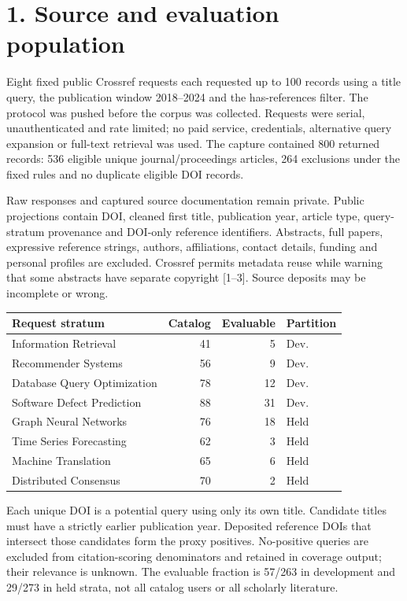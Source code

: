 \documentclass[10pt,letterpaper]{article}
\begin{document}
\newpage
\section*{1. Source and evaluation population}
Eight fixed public Crossref requests each requested up to 100 records using a title query, the publication window 2018--2024 and the has-references filter. The protocol was pushed before the corpus was collected. Requests were serial, unauthenticated and rate limited; no paid service, credentials, alternative query expansion or full-text retrieval was used. The capture contained 800 returned records: 536 eligible unique journal/proceedings articles, 264 exclusions under the fixed rules and no duplicate eligible DOI records.

Raw responses and captured source documentation remain private. Public projections contain DOI, cleaned first title, publication year, article type, query-stratum provenance and DOI-only reference identifiers. Abstracts, full papers, expressive reference strings, authors, affiliations, contact details, funding and personal profiles are excluded. Crossref permits metadata reuse while warning that some abstracts have separate copyright [1--3]. Source deposits may be incomplete or wrong.

\begin{center}\small
\begin{tabular}{lrrl}\toprule
Request stratum & Catalog & Evaluable & Partition\\\midrule
Information Retrieval & 41 & 5 & Dev. \\
Recommender Systems & 56 & 9 & Dev. \\
Database Query Optimization & 78 & 12 & Dev. \\
Software Defect Prediction & 88 & 31 & Dev. \\
Graph Neural Networks & 76 & 18 & Held \\
Time Series Forecasting & 62 & 3 & Held \\
Machine Translation & 65 & 6 & Held \\
Distributed Consensus & 70 & 2 & Held \\
\bottomrule\end{tabular}
\end{center}

Each unique DOI is a potential query using only its own title. Candidate titles must have a strictly earlier publication year. Deposited reference DOIs that intersect those candidates form the proxy positives. No-positive queries are excluded from citation-scoring denominators and retained in coverage output; their relevance is unknown. The evaluable fraction is 57/263 in development and 29/273 in held strata, not all catalog users or all scholarly literature.
\end{document}
